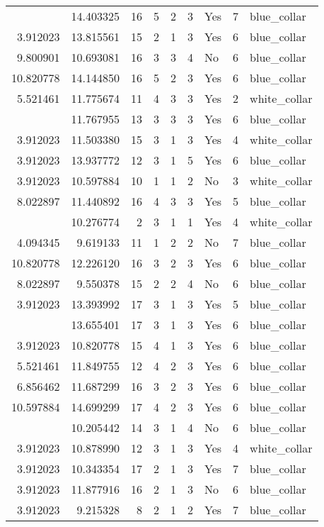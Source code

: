 \documentclass[
]{article}
\begin{document}
\begin{longtable}[t]{rrrrrllrl}
\addlinespace
12.611704 & 14.403325 & 16 & 5 & 2 & 3 & Yes & 7 & blue\_collar\\
3.912023 & 13.815561 & 15 & 2 & 1 & 3 & Yes & 6 & blue\_collar\\
9.800901 & 10.693081 & 16 & 3 & 3 & 4 & No & 6 & blue\_collar\\
10.820778 & 14.144850 & 16 & 5 & 2 & 3 & Yes & 6 & blue\_collar\\
5.521461 & 11.775674 & 11 & 4 & 3 & 3 & Yes & 2 & white\_collar\\
\addlinespace
10.820778 & 11.767955 & 13 & 3 & 3 & 3 & Yes & 6 & blue\_collar\\
3.912023 & 11.503380 & 15 & 3 & 1 & 3 & Yes & 4 & white\_collar\\
3.912023 & 13.937772 & 12 & 3 & 1 & 5 & Yes & 6 & blue\_collar\\
3.912023 & 10.597884 & 10 & 1 & 1 & 2 & No & 3 & white\_collar\\
8.022897 & 11.440892 & 16 & 4 & 3 & 3 & Yes & 5 & blue\_collar\\
\addlinespace
3.912023 & 10.276774 & 2 & 3 & 1 & 1 & Yes & 4 & white\_collar\\
4.094345 & 9.619133 & 11 & 1 & 2 & 2 & No & 7 & blue\_collar\\
10.820778 & 12.226120 & 16 & 3 & 2 & 3 & Yes & 6 & blue\_collar\\
8.022897 & 9.550378 & 15 & 2 & 2 & 4 & No & 6 & blue\_collar\\
3.912023 & 13.393992 & 17 & 3 & 1 & 3 & Yes & 5 & blue\_collar\\
\addlinespace
3.912023 & 13.655401 & 17 & 3 & 1 & 3 & Yes & 6 & blue\_collar\\
3.912023 & 10.820778 & 15 & 4 & 1 & 3 & Yes & 6 & blue\_collar\\
5.521461 & 11.849755 & 12 & 4 & 2 & 3 & Yes & 6 & blue\_collar\\
6.856462 & 11.687299 & 16 & 3 & 2 & 3 & Yes & 6 & blue\_collar\\
10.597884 & 14.699299 & 17 & 4 & 2 & 3 & Yes & 6 & blue\_collar\\
\addlinespace
3.912023 & 10.205442 & 14 & 3 & 1 & 4 & No & 6 & blue\_collar\\
3.912023 & 10.878990 & 12 & 3 & 1 & 3 & Yes & 4 & white\_collar\\
3.912023 & 10.343354 & 17 & 2 & 1 & 3 & Yes & 7 & blue\_collar\\
3.912023 & 11.877916 & 16 & 2 & 1 & 3 & No & 6 & blue\_collar\\
3.912023 & 9.215328 & 8 & 2 & 1 & 2 & Yes & 7 & blue\_collar\\

\end{longtable}
\end{document}
